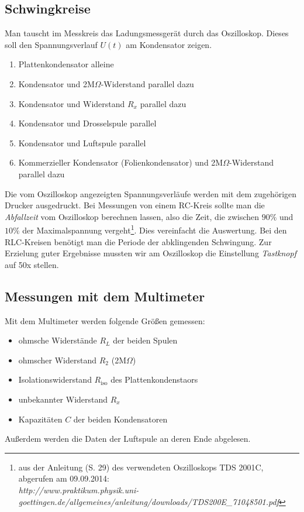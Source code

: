 \documentclass[12pt,a4paper,titlepage,headinclude,bibtotoc]{scrartcl}
\begin{document}
\subsection{Schwingkreise}
Man tauscht im Messkreis das Ladungsmessgerät durch das Oszilloskop.
Dieses soll den Spannungsverlauf $U(t)$ am Kondensator zeigen.
\begin{enumerate}
	\item Plattenkondensator alleine
	\item Kondensator und 2M$\Omega$-Widerstand parallel dazu
	\item Kondensator und Widerstand $R_x$ parallel dazu
	\item Kondensator und Drosselspule parallel
	\item Kondensator und Luftspule parallel
	\item Kommerzieller Kondensator (Folienkondensator) und 2M$\Omega$-Widerstand parallel dazu	
\end{enumerate}
Die vom Oszilloskop angezeigten Spannungsverläufe werden mit dem zugehörigen Drucker ausgedruckt.
Bei Messungen von einem RC-Kreis sollte man die \emph{Abfallzeit} vom Oszilloskop berechnen lassen, also die Zeit, die zwischen $90\%$ und $10\%$ der Maximalspannung vergeht\footnote{aus der Anleitung (S. 29) des verwendeten Oszilloskops TDS 2001C, abgerufen am 09.09.2014:\\ 
\emph{http://www.praktikum.physik.uni-goettingen.de/allgemeines/anleitung/downloads/TDS200E\_71048501.pdf}}.
Dies vereinfacht die Auswertung.
Bei den RLC-Kreisen benötigt man die Periode der abklingenden Schwingung. 
Zur Erzielung guter Ergebnisse mussten wir am Oszilloskop die Einstellung \emph{Tastknopf} auf 50x stellen.

\subsection{Messungen mit dem Multimeter}
Mit dem Multimeter werden folgende Größen gemessen:
\begin{itemize}
	\item ohmsche Widerstände $R_L$ der beiden Spulen
	\item ohmscher Widerstand $R_2$ (2M$\Omega$)
	\item Isolationswiderstand $R_\text{iso}$ des Plattenkondenstaors
	\item unbekannter Widerstand $R_x$
 	\item Kapazitäten $C$ der beiden Kondensatoren  
\end{itemize}
Außerdem werden die Daten der Luftspule an deren Ende abgelesen.
\end{document}
